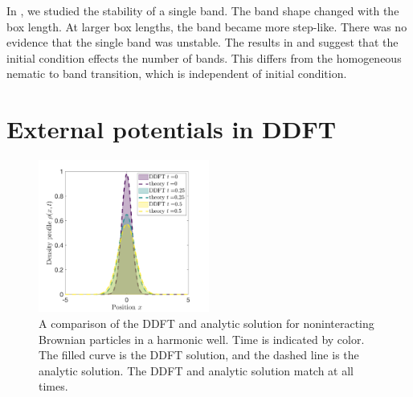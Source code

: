 In , we studied the stability of a single band. The
band shape changed with the box length. At larger box lengths, the band became
more step-like. There was no evidence that the single band was unstable. The
results in  and  suggest that
the initial condition effects the number of bands. This differs from the
homogeneous nematic to band transition, which is independent of initial
condition.

\section{External potentials in DDFT}
\begin{figure}[!ht]
	\centering
  \includegraphics[width=0.50\textwidth]{figs/ch05_valid/external_pot_validation.png}
  \caption[External potential validation]
  {A comparison of the DDFT and analytic solution for noninteracting
    Brownian particles in a harmonic well. Time is indicated by color. The
  filled curve is the DDFT solution, and the dashed line is the analytic
  solution. The DDFT and analytic solution match at all times.}\label{fig:ext_pot}
\end{figure}

